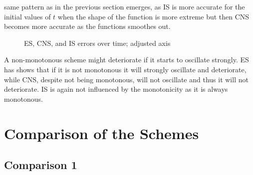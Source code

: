 \documentclass[a4paper, 12pt, reqno]{article}
\begin{document}
same pattern as in the previous section emerges, as IS is more accurate for the
initial values of $t$ when the shape of the function is more extreme but then
CNS becomes more accurate as the functions smoothes out.
\begin{figure}[H]
    \center
    \vspace{-20pt}
    \caption{ES, CNS, and IS errors over time; adjusted axis}
    \label{ds05}
\end{figure}
A non-monotonous scheme might deteriorate if it starts to oscillate strongly. ES
has shows that if it is not monotonous it will strongly oscillate and
deteriorate, while CNS,
despite not being monotonous, will not oscillate and thus it will not
deteriorate. IS is again not influenced by the monotonicity as it is always
monotonous.

\section{Comparison of the Schemes}

\subsection{Comparison 1}
\end{document}
